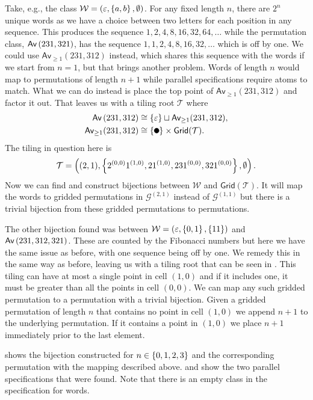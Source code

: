 Take, e.g., the class $\mathcal{W} = (\varepsilon, \left\{a,b\right\}, \emptyset)$. For any fixed length $n$, there are $2^n$ unique words as we have a choice between two letters for each position in any sequence. This produces the sequence $1, 2, 4, 8, 16, 32, 64, \dotsc$ while the permutation class, $\textsf{Av}\left(231,321\right)$, has the sequence $1, 1, 2, 4, 8, 16, 32, \dotsc$ which is off by one. We could use $\textsf{Av}_{\geq1}(231,312)$ instead, which shares this sequence with the words if we start from $n=1$, but that brings another problem. Words of length $n$ would map to permutations of length $n+1$ while parallel specifications require atoms to match. What we can do instead is place the top point of $\textsf{Av}_{\geq1}(231,312)$ and factor it out. That leaves us with a tiling root $\mathcal{T}$ where
\begin{align*}
    \Av{231,312} &\cong \set{\varepsilon} \sqcup \textsf{Av}_{\geq1}(231,312),\\
    \textsf{Av}_{\geq1}(231,312) &\cong \set{\point{0.1}}\times \textsf{Grid}(\mathcal{T}).
\end{align*}
The tiling in question here is
\[
    \mathcal{T} = \left((2,1), \left\{2^{(0,0)}1^{(1,0)}, 21^{(1,0)}, 231^{(0,0)}, 321^{(0,0)}\right\},\emptyset\right).
\]
Now we can find and construct bijections between $\mathcal{W}$ and $\textsf{Grid}(\mathcal{T})$. It will map the words to gridded permutations in $\mathcal{G}^{(2,1)}$ instead of $\mathcal{G}^{(1,1)}$ but there is a trivial bijection from these gridded permutations to permutations.

The other bijection found was between $\mathcal{W} = (\varepsilon, \left\{0,1\right\}, \left\{11\right\})$ and $\textsf{Av}\left(231,312,321\right)$. These are counted by the Fibonacci numbers but here we have the same issue as before, with one sequence being off by one. We remedy this in the same way as before, leaving us with a tiling root that can be seen in . This tiling can have at most a single point in cell $(1,0)$ and if it includes one, it must be greater than all the points in cell $(0,0)$. We can map any such gridded permutation to a permutation with a trivial bijection. Given a gridded permutation of length $n$ that contains no point in cell $(1,0)$ we append $n+1$ to the underlying permutation. If it contains a point in $(1,0)$ we place $n+1$ immediately prior to the last element.

 shows the bijection constructed for $n \in \left\{0,1,2,3\right\}$ and the corresponding permutation with the mapping described above.  and  show the two parallel specifications that were found. Note that there is an empty class in the specification for words.

